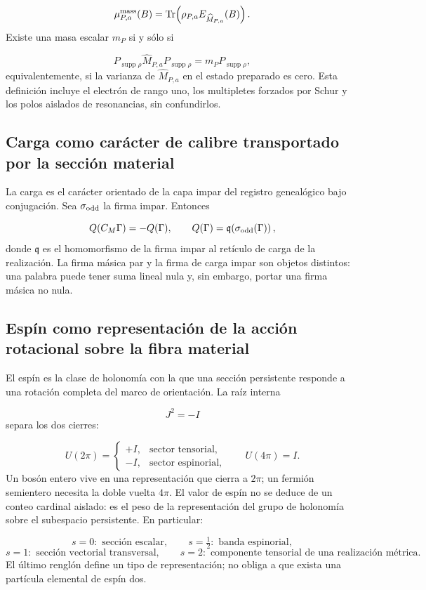 \[
 \mu_{P,a}^{\rm mass}(B)
 =\operatorname{Tr}\!\left(
 \rho_{P,a}E_{\widehat M_{P,a}}(B)\right).
\]
Existe una masa escalar \(m_P\) si y sólo si

\[
 P_{\operatorname{supp}\rho}\widehat M_{P,a}
 P_{\operatorname{supp}\rho}
 =m_P P_{\operatorname{supp}\rho},
\]
equivalentemente, si la varianza de \(\widehat M_{P,a}\) en el estado preparado es cero. Esta definición incluye el electrón de rango uno, los multipletes forzados por Schur y los polos aislados de resonancias, sin confundirlos.

\subsection{Carga como carácter de calibre transportado por la sección material}
La carga es el carácter orientado de la capa impar del registro genealógico bajo conjugación. Sea \(\sigma_{\rm odd}\) la firma impar. Entonces

\[
 Q(C_M\Gamma)=-Q(\Gamma),\qquad
 Q(\Gamma)=\mathfrak q\!\left(\sigma_{\rm odd}(\Gamma)\right),
\]
donde \(\mathfrak q\) es el homomorfismo de la firma impar al retículo de carga de la realización. La firma másica par y la firma de carga impar son objetos distintos: una palabra puede tener suma lineal nula y, sin embargo, portar una firma másica no nula.

\subsection{Espín como representación de la acción rotacional sobre la fibra material}
El espín es la clase de holonomía con la que una sección persistente responde a una rotación completa del marco de orientación. La raíz interna

\[
 J^2=-I
\]
separa los dos cierres:

\[
 U(2\pi)=
 \begin{cases}
 +I,&\text{sector tensorial},\\
 -I,&\text{sector espinorial},
 \end{cases}
 \qquad
 U(4\pi)=I.
\]
Un bosón entero vive en una representación que cierra a \(2\pi\); un fermión semientero necesita la doble vuelta \(4\pi\). El valor de espín no se deduce de un conteo cardinal aislado: es el peso de la representación del grupo de holonomía sobre el subespacio persistente. En particular:

\[
 s=0:\text{ sección escalar},\qquad
 s=\tfrac12:\text{ banda espinorial},
\]
\[
 s=1:\text{ sección vectorial transversal},\qquad
 s=2:\text{ componente tensorial de una realización métrica}.
\]
El último renglón define un tipo de representación; no obliga a que exista una partícula elemental de espín dos.

